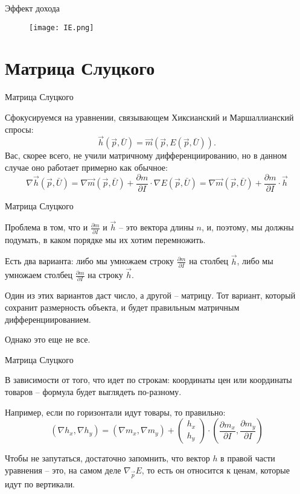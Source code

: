 \documentclass{beamer}
\begin{document}
\begin{frame}{Эффект дохода}

\begin{figure}[hbt]
\centering
\texttt{[image: IE.png]}
\end{figure}

\end{frame}

\section{Матрица Слуцкого}

\begin{frame}{Матрица Слуцкого}

Сфокусируемся на уравнении, связывающем Хиксианский и Маршаллианский спросы:
$$\vec h (\vec p, \bar U) = \vec m(\vec p,  E(\vec p, \bar U)).$$
Вас, скорее всего, не учили матричному дифференциированию, но в данном случае оно работает примерно как обычное:
$$ \nabla \vec h(\vec p,  \bar U) = \nabla \vec m(\vec p,  \bar U) + \frac{\partial m}{\partial I} \cdot \nabla E(\vec p, \bar U) = \nabla \vec m(\vec p,  \bar U) + \frac{\partial m}{\partial I} \cdot \vec h $$

\end{frame}

\begin{frame}{Матрица Слуцкого}

Проблема в том, что и $\frac{\partial m}{\partial I}$ и $\vec h$ – это вектора длины $n$, и, поэтому, мы должны подумать, в каком порядке мы их хотим перемножить. 

Есть два варианта: либо мы умножаем строку $\frac{\partial m}{\partial I}$ на столбец $\vec h$, либо мы умножаем столбец $\frac{\partial m}{\partial I}$ на строку $\vec h$. 

Один из этих вариантов даст число, а другой – матрицу. Тот вариант, который сохранит размерность объекта, и будет правильным матричным дифференциированием. 

Однако это еще не все. 

\end{frame}

\begin{frame}{Матрица Слуцкого}

В зависимости от того, что идет по строкам: координаты цен или координаты товаров – формула будет выглядеть по-разному. 

Например, если по горизонтали идут товары, то правильно:
$$ 
(\nabla h_x, \nabla h_y) = (\nabla m_x, \nabla m_y) + 
\begin{pmatrix} 
h_x \\
h_y
\end{pmatrix} 
\cdot (\frac{\partial m_x}{\partial I}, \frac{\partial m_y}{\partial I})
$$

Чтобы не запутаться, достаточно запомнить, что вектор $h$ в правой части уравнения – это, на самом деле $\nabla_{\vec p} E$, то есть он относится к ценам, которые идут по вертикали.

\end{frame}
\end{document}
